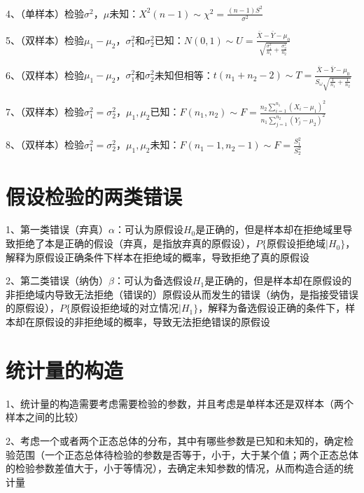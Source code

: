 4、（单样本）检验$\sigma^{2}$，$\mu$未知：$X^2(n-1) \sim \chi^{2}=\frac{(n-1) S^{2}}{\sigma^{2}}$

5、（双样本）检验$\mu_1-\mu_2$，$\sigma_{1}^{2}$和$\sigma_{2}^{2}$已知：$N(0,1) \sim U=\frac{\bar{X}-\bar{Y}-\mu_{0}}{\sqrt{\frac{\sigma_{1}^{2}}{n_{1}}+\frac{\sigma_{2}^{2}}{n_{2}}}}$

6、（双样本）检验$\mu_1-\mu_2$，$\sigma_{1}^{2}$和$\sigma_{2}^{2}$未知但相等：$t(n_1+n_2-2) \sim T=\frac{\bar{X}-\bar{Y}-\mu_{0}}{S_{\omega} \sqrt{\frac{1}{n_{1}}+\frac{1}{n_{2}}}}$

7、（双样本）检验$\sigma_{1}^{2} = \sigma_{2}^{2}$，$\mu_1,\mu_2$已知：$F(n_1,n_2) \sim F=\frac{n_{2} \sum_{i=1}^{n_{1}}\left(X_{i}-\mu_{1}\right)^{2}}{n_{1} \sum_{j=1}^{n_{2}}\left(Y_{j}-\mu_{2}\right)^{2}}$

8、（双样本）检验$\sigma_{1}^{2} = \sigma_{2}^{2}$，$\mu_1,\mu_2$未知：$F(n_1-1,n_2-1) \sim F=\frac{S_{1}^{2}}{S_{2}^{2}}$

\section{假设检验的两类错误}

1、第一类错误（弃真）$\alpha$：可认为原假设$H_0$是正确的，但是样本却在拒绝域里导致拒绝了本是正确的假设（弃真，是指放弃真的原假设），$P\{ 原假设拒绝域| H_0 \}$，解释为原假设正确条件下样本在拒绝域的概率，导致拒绝了真的原假设

2、第二类错误（纳伪）$\beta$：可认为备选假设$H_1$是正确的，但是样本却在原假设的非拒绝域内导致无法拒绝（错误的）原假设从而发生的错误（纳伪，是指接受错误的原假设），$P\{ 原假设拒绝域的对立情况| H_1 \}$，解释为备选假设正确的条件下，样本却在原假设的非拒绝域的概率，导致无法拒绝错误的原假设

\section{统计量的构造}

1、统计量的构造需要考虑需要检验的参数，并且考虑是单样本还是双样本（两个样本之间的比较）

2、考虑一个或者两个正态总体的分布，其中有哪些参数是已知和未知的，确定检验范围（一个正态总体待检验的参数是否等于，小于，大于某个值；两个正态总体的检验参数差值大于，小于等情况），去确定未知参数的情况，从而构造合适的统计量

